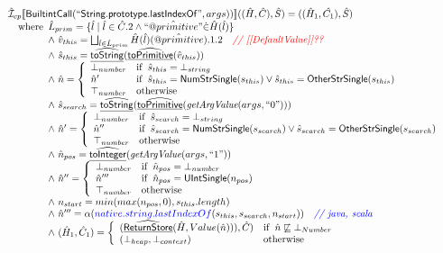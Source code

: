 \[\begin{array}{l}
\hat{\mathcal{I}} _{cp}\llbracket \mbox{\textsf{BuiltintCall}}(``\mbox{\textsf{String.prototype.lastIndexOf}}",args))\rrbracket((\hat{H},\hat{C}), \hat{S})
  = ((\hat{H}_1, \hat{C_1}), \hat{S})\\
\quad{\rm where}\begin{array}[t]{l} 
  \hat{L}_{prim} = \{ \hat{l} \mid \hat{l} \in \hat{C}.2 \land ``\hat{@primitive}" \dot{\in}\hat{H}(\hat{l}) \}\\
  \land\ \hat{v}_{this} = \bigsqcup_{\hat{l} \in \hat{L}_{prim}} \hat{H}(\hat{l})(\hat{@primitive}).1.2
    \quad\textit{{\color{red}// [[DefaultValue]]??}}\\
  \land\ \hat{s}_{this} = \widehat{\underline{\sf toString}}(\widehat{\underline{\sf toPrimitive}}(\hat{v}_{this}))\\
  \land\ \hat{n} = \left\{\begin{array}{ll}
      \bot_{number} & {\rm if}\begin{array}[t]{l}\hat{s}_{this} = \bot_{string}\end{array}\\
      \hat{n}' & {\rm if}\begin{array}[t]{l}\hat{s}_{this} = \mbox{\textsf{NumStrSingle}}(s_{this}) \lor \hat{s}_{this} = \mbox{\textsf{OtherStrSingle}}(s_{this}) \end{array}\\
      \top_{number} & {\rm otherwise}
    \end{array}\right.\\
  \land\ \hat{s}_{search} = \widehat{\underline{\sf toString}}(\widehat{\underline{\sf toPrimitive}}(\emph{getArgValue}(args, ``0")))\\  
  \land\ \hat{n}' = \left\{\begin{array}{ll}
      \bot_{number} & {\rm if}\begin{array}[t]{l}\hat{s}_{search} = \bot_{string}\end{array}\\
      \hat{n}'' & {\rm if}\begin{array}[t]{l}\hat{s}_{search} = \mbox{\textsf{NumStrSingle}}(s_{search}) \lor \hat{s}_{search} = \mbox{\textsf{OtherStrSingle}}(s_{search}) \end{array}\\
      \top_{number} & {\rm otherwise}
    \end{array}\right.\\
  \land\ \hat{n}_{pos} = \widehat{\underline{\sf toInteger}}(\emph{getArgValue}(args, ``1"))\\
  \land\ \hat{n}'' = \left\{\begin{array}{ll}
      \bot_{number} & {\rm if}\begin{array}[t]{l}\hat{n}_{pos} = \bot_{number}\end{array}\\
      \hat{n}''' & {\rm if}\begin{array}[t]{l}\hat{n}_{pos} = \mbox{\textsf{UIntSingle}}(n_{pos})\end{array}\\
      \top_{number} & {\rm otherwise}
    \end{array}\right.\\
  \land\ n_{start} = min(max(n_{pos}, 0), s_{this}.length)\\
  \land\ \hat{n}''' = \alpha({\color{blue} native.string.lastIndexOf}(s_{this}, s_{search}, n_{start}))
    \quad\textit{{\color{blue}// java, scala}}\\  
  \land\ (\hat{H}_1, \hat{C}_1) = 
    \left\{\begin{array}{ll}
      (\widehat{\underline{\sf ReturnStore}}(\hat{H}, Value(\hat{n}))), \hat{C})
      & {\rm if}\begin{array}[t]{l}\hat{n} \not\sqsubseteq \bot_{Number}\end{array}\\
      (\bot_{heap}, \bot_{context}) & {\rm otherwise} \\
    \end{array}\right.\\\
  \end{array}\\
\\\\

\end{array}
\]
